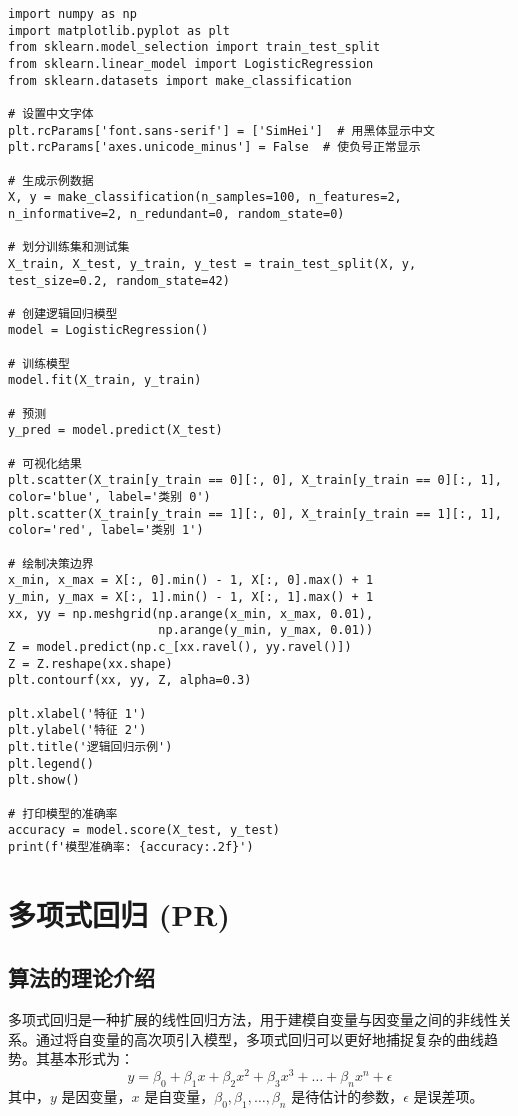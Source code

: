 \begin{lstlisting}
import numpy as np
import matplotlib.pyplot as plt
from sklearn.model_selection import train_test_split
from sklearn.linear_model import LogisticRegression
from sklearn.datasets import make_classification

# 设置中文字体
plt.rcParams['font.sans-serif'] = ['SimHei']  # 用黑体显示中文
plt.rcParams['axes.unicode_minus'] = False  # 使负号正常显示

# 生成示例数据
X, y = make_classification(n_samples=100, n_features=2, n_informative=2, n_redundant=0, random_state=0)

# 划分训练集和测试集
X_train, X_test, y_train, y_test = train_test_split(X, y, test_size=0.2, random_state=42)

# 创建逻辑回归模型
model = LogisticRegression()

# 训练模型
model.fit(X_train, y_train)

# 预测
y_pred = model.predict(X_test)

# 可视化结果
plt.scatter(X_train[y_train == 0][:, 0], X_train[y_train == 0][:, 1], color='blue', label='类别 0')
plt.scatter(X_train[y_train == 1][:, 0], X_train[y_train == 1][:, 1], color='red', label='类别 1')

# 绘制决策边界
x_min, x_max = X[:, 0].min() - 1, X[:, 0].max() + 1
y_min, y_max = X[:, 1].min() - 1, X[:, 1].max() + 1
xx, yy = np.meshgrid(np.arange(x_min, x_max, 0.01),
                     np.arange(y_min, y_max, 0.01))
Z = model.predict(np.c_[xx.ravel(), yy.ravel()])
Z = Z.reshape(xx.shape)
plt.contourf(xx, yy, Z, alpha=0.3)

plt.xlabel('特征 1')
plt.ylabel('特征 2')
plt.title('逻辑回归示例')
plt.legend()
plt.show()

# 打印模型的准确率
accuracy = model.score(X_test, y_test)
print(f'模型准确率: {accuracy:.2f}')

\end{lstlisting}

\section{多项式回归 (PR)}
\subsection*{算法的理论介绍}
多项式回归是一种扩展的线性回归方法，用于建模自变量与因变量之间的非线性关系。通过将自变量的高次项引入模型，多项式回归可以更好地捕捉复杂的曲线趋势。其基本形式为：
\[
    y = \beta_0 + \beta_1 x + \beta_2 x^2 + \beta_3 x^3 + \ldots + \beta_n x^n + \epsilon
\]
其中，\(y\) 是因变量，\(x\) 是自变量，\(\beta_0, \beta_1, \ldots, \beta_n\) 是待估计的参数，\(\epsilon\) 是误差项。

